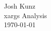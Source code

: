 \documentclass{article}
\newcommand{\header}[2]{%
    \begin{flushright}
    #1 \\
    #2 \\
    \today \\
    \end{flushright}%
}
\begin{document}
\header{Josh Kunz}{xargs Analysis}
\end{document}
